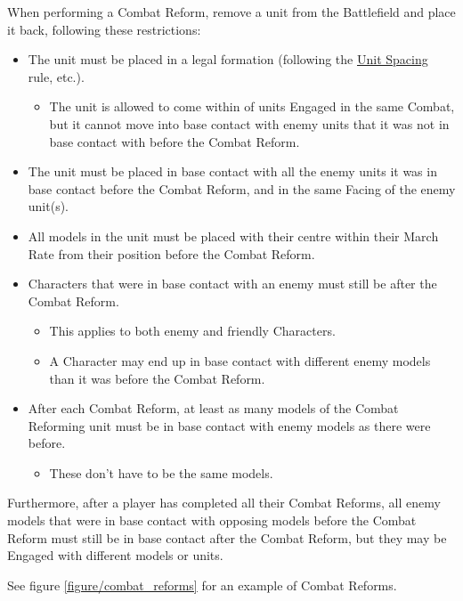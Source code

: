 {When performing a Combat Reform, remove a unit from the Battlefield and place it back, following these restrictions:

\begin{itemize}
\item The unit must be placed in a legal formation (following the \hyperref[unit_spacing]{Unit Spacing} rule, etc.).
\begin{itemize}
\item The unit is allowed to come within  of units Engaged in the same Combat, but it cannot move into base contact with enemy units that it was not in base contact with before the Combat Reform.
\end{itemize}
\item The unit must be placed in base contact with all the enemy units it was in base contact before the Combat Reform, and in the same Facing of the enemy unit(s).
\item All models in the unit must be placed with their centre within their March Rate from their position before the Combat Reform.
\item Characters that were in base contact with an enemy must still be after the Combat Reform.
\begin{itemize}
\item This applies to both enemy and friendly Characters.
\item A Character may end up in base contact with different enemy models than it was before the Combat Reform.
\end{itemize}
\item After each Combat Reform, at least as many models of the Combat Reforming unit must be in base contact with enemy models as there were before.
\begin{itemize}
\item These don't have to be the same models.
\end{itemize}
\end{itemize}

Furthermore, after a player has completed all their Combat Reforms, all enemy models that were in base contact with opposing models before the Combat Reform must still be in base contact after the Combat Reform, but they may be Engaged with different models or units.

See figure \ref{figure/combat_reforms} for an example of Combat Reforms.

\newcommand{\figCombRefA}{a)}
\newcommand{\figCombRefB}{b)}
\newcommand{\figCombRefC}{c)}
\newcommand{\figCombRefCharOne}{{\fontsize{7}{8}\selectfont$C_{1}$}}
\newcommand{\figCombRefCharTwo}{{\fontsize{7}{8}\normalfontsize$C_{2}$}}

}
